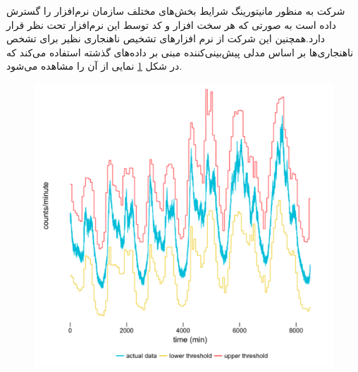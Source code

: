 شرکت  به منظور مانیتورینگ شرایط بخش‌های مختلف سازمان نرم‌افزار \cite{m3} را گسترش داده است به صورتی که هر سخت افزار و کد توسط این نرم‌افزار تحت نظر قرار دارد.همچنین این شرکت از نرم افزار‌های تشخیص ناهنجاری نظیر \cite{argos} برای تشخص ناهنجاری‌ها بر اساس مدلی پیش‌بینی‌کننده مبنی بر داده‌های گذشته استفاده می‌کند که در شکل \ref{fig:argos} نمایی از آن را مشاهده می‌شود.

\begin{figure}[h]
\centering
\includegraphics[scale=0.5]{argos.png}
\caption{}
\label{fig:argos}
\end{figure}
